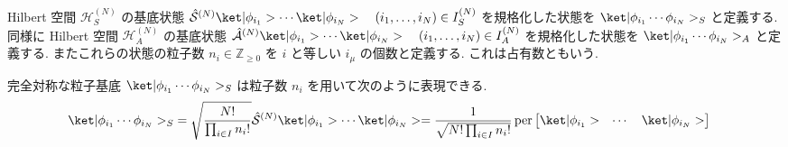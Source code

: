 \documentclass[uplatex,dvipdfmx,a4paper,11pt]{jlreq}
\DeclareMathOperator{\per}{per}
\newcommand{\ZZ}{\mathbb{Z}}
\newcommand{\HH}{\mathcal{H}}
\renewcommand{\S}{\mathcal{S}}
\newcommand{\A}{\mathcal{A}}
\numberwithin{equation}{section}
\theoremstyle{definition}
\begin{document}
\begin{definition}
  Hilbert 空間 $\HH_S^{(N)}$ の基底状態 $\hat{\S}^{(N)}\ket|\phi_{i_1}>\cdots\ket|\phi_{i_N}> \quad (i_1,\ldots,i_N)\in I_S^{(N)}$ を規格化した状態を $\ket|\phi_{i_1}\cdots\phi_{i_N}>_S$ と定義する.
  同様に Hilbert 空間 $\HH_A^{(N)}$ の基底状態 $\hat{\A}^{(N)}\ket|\phi_{i_1}>\cdots\ket|\phi_{i_N}> \quad (i_1,\ldots,i_N)\in I_A^{(N)}$ を規格化した状態を $\ket|\phi_{i_1}\cdots\phi_{i_N}>_A$ と定義する.
  またこれらの状態の粒子数 $n_i\in\ZZ_{\geq 0}$ を $i$ と等しい $i_\mu$ の個数と定義する. これは占有数ともいう.
\end{definition}
\begin{theorem}[Q21-19(i), Q21-20(i)(ii)(iii)]
  完全対称な粒子基底 $\ket|\phi_{i_1}\cdots\phi_{i_N}>_S$ は粒子数 $n_i$ を用いて次のように表現できる.
  \begin{align}
    \ket|\phi_{i_1}\cdots\phi_{i_N}>_S & = \sqrt{\frac{N!}{\prod_{i\in I}n_i!}}\hat{\S}^{(N)}\ket|\phi_{i_1}>\cdots\ket|\phi_{i_N}> = \frac{1}{\sqrt{N!\prod_{i\in I}n_i!}}\per\begin{bmatrix}\ket|\phi_{i_1}> & \cdots & \ket|\phi_{i_N}>\end{bmatrix}
  \end{align}
\end{theorem}
\end{document}
